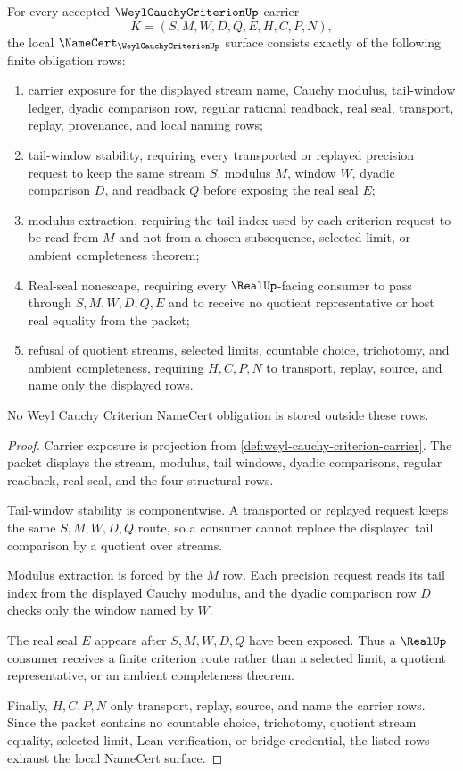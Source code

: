 \begin{theorem}
\label{thm:weyl-cauchy-criterion-namecert-obligations}
For every accepted $\WeylCauchyCriterionUp$ carrier
$$
K=(S,M,W,D,Q,E,H,C,P,N),
$$
the local $\NameCert_{\WeylCauchyCriterionUp}$ surface consists exactly of the following finite obligation rows:
\begin{enumerate}
\item carrier exposure for the displayed stream name, Cauchy modulus, tail-window ledger, dyadic comparison row, regular rational readback, real seal, transport, replay, provenance, and local naming rows;
\item tail-window stability, requiring every transported or replayed precision request to keep the same stream $S$, modulus $M$, window $W$, dyadic comparison $D$, and readback $Q$ before exposing the real seal $E$;
\item modulus extraction, requiring the tail index used by each criterion request to be read from $M$ and not from a chosen subsequence, selected limit, or ambient completeness theorem;
\item Real-seal nonescape, requiring every $\RealUp$-facing consumer to pass through $S,M,W,D,Q,E$ and to receive no quotient representative or host real equality from the packet;
\item refusal of quotient streams, selected limits, countable choice, trichotomy, and ambient completeness, requiring $H,C,P,N$ to transport, replay, source, and name only the displayed rows.
\end{enumerate}
No Weyl Cauchy Criterion NameCert obligation is stored outside these rows.
\end{theorem}

\begin{proof}
Carrier exposure is projection from \autoref{def:weyl-cauchy-criterion-carrier}. The packet displays the stream, modulus, tail windows, dyadic comparisons, regular readback, real seal, and the four structural rows.

Tail-window stability is componentwise. A transported or replayed request keeps the same $S,M,W,D,Q$ route, so a consumer cannot replace the displayed tail comparison by a quotient over streams.

Modulus extraction is forced by the $M$ row. Each precision request reads its tail index from the displayed Cauchy modulus, and the dyadic comparison row $D$ checks only the window named by $W$.

The real seal $E$ appears after $S,M,W,D,Q$ have been exposed. Thus a $\RealUp$ consumer receives a finite criterion route rather than a selected limit, a quotient representative, or an ambient completeness theorem.

Finally, $H,C,P,N$ only transport, replay, source, and name the carrier rows. Since the packet contains no countable choice, trichotomy, quotient stream equality, selected limit, Lean verification, or bridge credential, the listed rows exhaust the local NameCert surface.
\end{proof}

